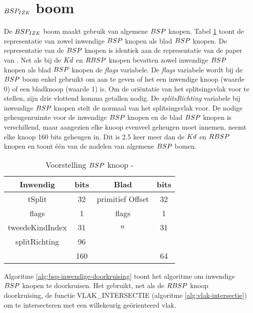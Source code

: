 \section{$BSP_{IZE}$ boom}
\label{sec:h4-bspize}
De $BSP_{IZE}$ boom maakt gebruik van algemene $\symBSP$ knopen. 
Tabel \ref{tab:voorstelling-bsp-knoop} toont de representatie van zowel inwendige $\symBSP$ knopen als blad $\symBSP$ knopen.
De representatie van de $\symBSP$ knopen is identiek aan de representatie van de paper van \authorIze{} \cite{ize}.
Net als bij de $Kd$ en $RBSP$ knopen bevatten zowel inwendige $\symBSP$ knopen als blad $\symBSP$ knopen de \textit{flags} variabele.
De \textit{flags} variabele wordt bij de $\symBSP$ boom enkel gebruikt om aan te geven of het een inwendige knoop (waarde 0) of een bladknoop (waarde 1) is.
Om de oriëntatie van het splitsingsvlak voor te stellen, zijn drie vlottend komma getallen nodig.
De \textit{splitsRichting} variabele bij inwendige $\symBSP$ knopen stelt de normaal van het splitsingsvlak voor.
De nodige geheugenruimte voor de inwendige $\symBSP$ knopen en de blad $\symBSP$ knopen is verschillend, maar aangezien elke knoop evenveel geheugen moet innemen, neemt elke knoop 160 bits geheugen in.
Dit is 2.5 keer meer dan de $Kd$ en $RBSP$ knopen en toont één van de nadelen van algemene $\symBSP$ bomen.\\
\begin{table}
        \centering
        \begin{tabular}{@{}|c|c|c|c|@{}} \toprule      
            Inwendig & bits & Blad & bits \\ \midrule
            tSplit & 32 & primitief Offset & 32 \\
            flags  & 1  &  flags   & 1    \\
            tweedeKindIndex & 31 & $n$ & 31 \\
            splitRichting & 96 &  &  \\ \hline \hline
            & 160 & & 64    \\ \bottomrule
        \end{tabular}
    \caption[Voorstelling $\symBSP$ knoop]{Voorstelling $\symBSP$ knoop - \small }
    \label{tab:voorstelling-bsp-knoop}
\end{table}   

Algoritme \ref{alg:bsp-inwendige-doorkruising} toont het algoritme om inwendige $\symBSP$ knopen te doorkruisen.
Het gebruikt, net als de $RBSP$ knoop doorkruising, de functie VLAK\_INTERSECTIE (algoritme \ref{alg:vlak-intersectie}) om te intersecteren met een willekeurig geörienteerd vlak.
  
